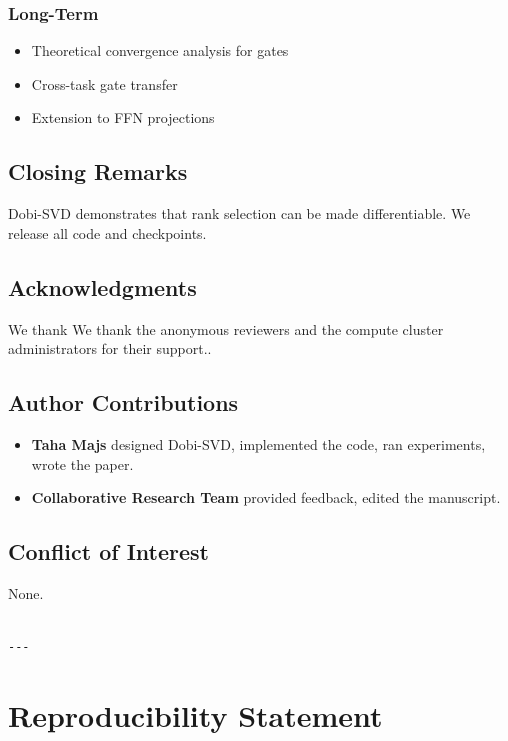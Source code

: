 \subsubsection{Long-Term}
\begin{itemize}
\item Theoretical convergence analysis for gates
\item Cross-task gate transfer
\item Extension to FFN projections

\end{itemize}
\subsection{Closing Remarks}

Dobi-SVD demonstrates that rank selection can be made differentiable. We 
release all code and checkpoints.

\subsection{Acknowledgments}

We thank We thank the anonymous reviewers and the compute cluster administrators for their support..

\subsection{Author Contributions}

\begin{itemize}
\item \textbf{Taha Majs} designed Dobi-SVD, implemented the code, ran experiments,
  wrote the paper.
\item \textbf{Collaborative Research Team} provided feedback, edited the manuscript.

\end{itemize}
\subsection{Conflict of Interest}

None.
\begin{lstlisting}

---
\end{lstlisting}


\section{Reproducibility Statement}

